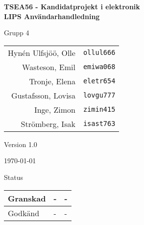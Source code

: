 \documentclass[11pt]{article}
\begin{document}
\begin{titlepage}
\begin{center}

{\Large\bfseries TSEA56 - Kandidatprojekt i elektronik \\ LIPS Användarhandledning}

\begin{figure}[!htbp]
  \begin{center}
\noindent{}
  \end{center}
\end{figure}


  \begin{minipage}{0.5\textwidth}
    \centering
 Grupp 4 \\
\begin{tabular}{rl}
Hynén Ulfsjöö, Olle&\verb+ollul666+
\\
Wasteson, Emil&\verb+emiwa068+
\\
Tronje, Elena&\verb+eletr654+
\\
Gustafsson, Lovisa&\verb+lovgu777+
\\
Inge, Zimon&\verb+zimin415+
\\
Strömberg, Isak&\verb+isast763+
\\
\end{tabular}
\end{minipage}%
\begin{minipage}{0.5\textwidth}
  \centering
Version 1.0

\today
\vspace{2em}

Status
\begin{longtable}{|l|l|l|} \hline

Granskad & - & - \\ \hline
Godkänd & - & - \\ \hline
 
\end{longtable}
\end{minipage}


\end{center}
\end{titlepage}
\end{document}

